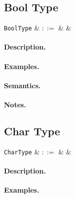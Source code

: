 
\subsection{Bool Type}

\begin{syntax}
 \verb+BoolType+ & $::=$ &  &\\
\end{syntax}

\paragraph{Description.}

\paragraph{Examples.}

\paragraph{Semantics.}

\paragraph{Notes.} 


\subsection{Char Type}

\begin{syntax}
  \verb+CharType+ & $::=$ &  & \\
\end{syntax}

\paragraph{Description.}

\paragraph{Examples.}

